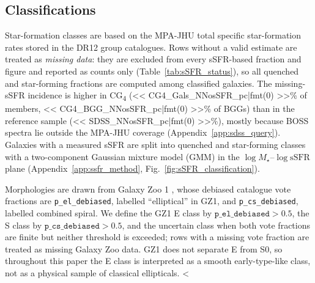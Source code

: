 \documentclass{aa}
\newcommand{\CG}{CG\textsubscript{4}}
\begin{document}
\subsection{Classifications}\label{sec:ssfr_classification}
Star-formation classes are based on the MPA-JHU total specific star-formation rates \citep{Brinchmann+04,Kauffmann+03b} stored in the DR12 group catalogues. Rows without a valid estimate are treated as \emph{missing data}: they are excluded from every sSFR-based fraction and figure and reported as counts only (Table~\ref{tab:sSFR_status}), so all quenched and star-forming fractions are computed among classified galaxies. The missing-sSFR incidence is higher in \CG{} (<< CG4_Gals_NNosSFR_pc|fmt(0) >>\% of members, << CG4_BGG_NNosSFR_pc|fmt(0) >>\% of BGGs) than in the reference sample (<< SDSS_NNosSFR_pc|fmt(0) >>\%), mostly because BOSS spectra lie outside the MPA-JHU coverage (Appendix~\ref{app:sdss_query}). Galaxies with a measured sSFR are split into quenched and star-forming classes with a two-component Gaussian mixture model (GMM) in the \(\log M_\star\)--\(\log\mathrm{sSFR}\) plane (Appendix~\ref{app:ssfr_method}, Fig.~\ref{fig:sSFR_classification}).

Morphologies are drawn from Galaxy Zoo 1 \citep{Lintott+08,GalaxyZoo1}, whose debiased catalogue vote fractions \citep{Bamford+09} are \texttt{p\_el\_debiased}, labelled ``elliptical'' in GZ1, and \texttt{p\_cs\_debiased}, labelled combined spiral. We define the GZ1 E class by \(\texttt{p\_el\_debiased}>0.5\), the S class by \(\texttt{p\_cs\_debiased}>0.5\), and the uncertain class when both vote fractions are finite but neither threshold is exceeded; rows with a missing vote fraction are treated as missing Galaxy Zoo data. GZ1 does not separate E from S0, so throughout this paper the E class is interpreted as a smooth early-type-like class, not as a physical sample of classical ellipticals. <%
\end{document}
